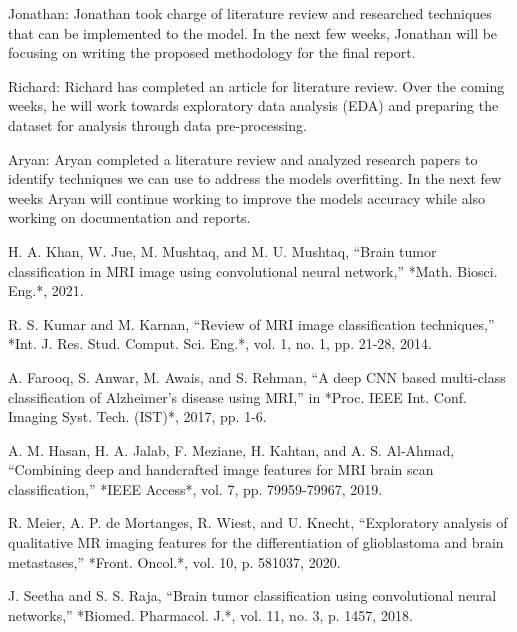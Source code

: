\documentclass[conference]{IEEEtran}
\begin{document}
Jonathan: Jonathan took charge of literature review and researched techniques that can be implemented to the model. In the next few weeks, Jonathan will be focusing on writing the proposed methodology for the final report.

Richard: Richard has completed an article for literature review. Over the coming weeks, he will work towards exploratory data analysis (EDA) and preparing the dataset for analysis through data pre-processing.

Aryan: Aryan completed a literature review and analyzed research papers to identify techniques we can use to address the models overfitting. In the next few weeks Aryan will continue working to improve the models accuracy while also working on documentation and reports. 

\begin{thebibliography}{00}

H. A. Khan, W. Jue, M. Mushtaq, and M. U. Mushtaq, “Brain tumor classification in MRI image using convolutional neural network,” *Math. Biosci. Eng.*, 2021. 

R. S. Kumar and M. Karnan, “Review of MRI image classification techniques,” *Int. J. Res. Stud. Comput. Sci. Eng.*, vol. 1, no. 1, pp. 21-28, 2014. 

A. Farooq, S. Anwar, M. Awais, and S. Rehman, “A deep CNN based multi-class classification of Alzheimer's disease using MRI,” in *Proc. IEEE Int. Conf. Imaging Syst. Tech. (IST)*, 2017, pp. 1-6. 

A. M. Hasan, H. A. Jalab, F. Meziane, H. Kahtan, and A. S. Al-Ahmad, “Combining deep and handcrafted image features for MRI brain scan classification,” *IEEE Access*, vol. 7, pp. 79959-79967, 2019. 

R. Meier, A. P. de Mortanges, R. Wiest, and U. Knecht, “Exploratory analysis of qualitative MR imaging features for the differentiation of glioblastoma and brain metastases,” *Front. Oncol.*, vol. 10, p. 581037, 2020.

J. Seetha and S. S. Raja, “Brain tumor classification using convolutional neural networks,” *Biomed. Pharmacol. J.*, vol. 11, no. 3, p. 1457, 2018.

\end{thebibliography}
\end{document}
